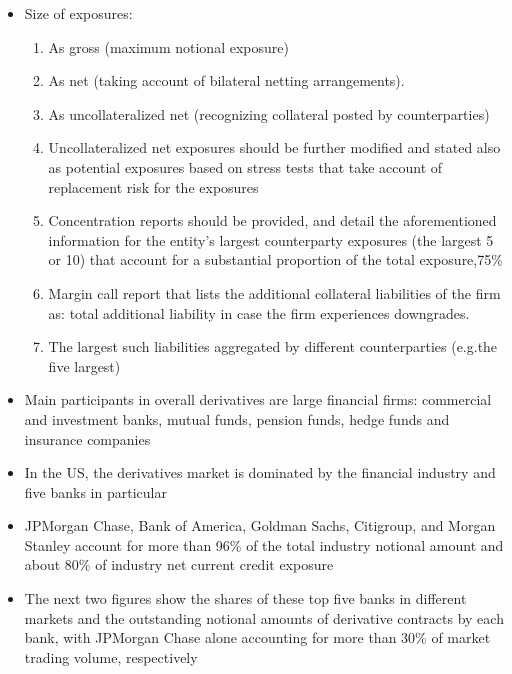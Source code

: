 \documentclass[11pt]{beamer}
\begin{document}
\begin{frame}
\begin{itemize}
\item Size of exposures:
\begin{enumerate}
\item As gross (maximum notional exposure)
\item As net (taking account of bilateral netting arrangements).
\item As uncollateralized net (recognizing collateral posted by counterparties)
\item Uncollateralized net exposures should be further modified and stated also as potential exposures based on stress tests that take account of replacement risk for the exposures
 \item Concentration reports should be provided, and detail the aforementioned information for the entity’s largest counterparty exposures (the largest 5 or 10) that account for a substantial proportion of the total exposure,75\%
\item Margin call report that lists the additional collateral liabilities of the firm as: total additional liability in case the firm experiences downgrades.
\item The largest such liabilities aggregated by different counterparties (e.g.the five largest)
\end{enumerate}
\end{itemize}
\end{frame}

\begin{frame}
\begin{itemize}
\item Main participants in overall derivatives are large financial
firms: commercial and investment banks, mutual funds, pension funds,
hedge funds and insurance companies
\item In the US, the derivatives market is dominated by the financial industry and five banks in particular
\item JPMorgan Chase, Bank of America, Goldman Sachs, Citigroup,
and Morgan Stanley account for more than 96\% of the total industry
notional amount and about 80\% of industry net current credit
exposure
\item The next two figures show the shares of these top five banks in different markets and the outstanding notional amounts of derivative contracts by each bank, with JPMorgan Chase alone accounting for more than 30\% of market trading volume, respectively
\end{itemize}
\end{frame}
\end{document}
